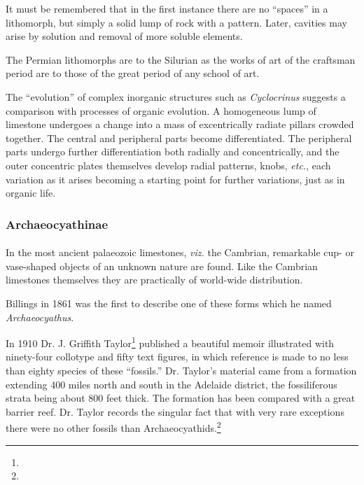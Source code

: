 \documentclass[a4paper, 12pt, oneside]{article}
\begin{document}
It must be remembered that in the first instance there are no ``spaces'' in a lithomorph, but simply a solid lump of rock with a pattern. Later, cavities may arise by solution and removal of more soluble elements.

The Permian lithomorphs are to the Silurian as the works of art of the craftsman period are to those of the great period of any school of art.

The ``evolution'' of complex inorganic structures such as \emph{Cyclocrinus} suggests a comparison with processes of organic evolution. A homogeneous lump of limestone undergoes a change into a mass of excentrically radiate pillars crowded together. The central and peripheral parts become differentiated. The peripheral parts undergo further differentiation both radially and concentrically, and the outer concentric plates themselves develop radial patterns, knobs, \emph{etc.}, each variation as it arises becoming a starting point for further variations, just as in organic life.

\subsubsection{Archaeocyathinae}
\paragraph{}
In the most ancient palaeozoic limestones, \emph{viz.} the Cambrian, remarkable cup- or vase-shaped objects of an unknown nature are found. Like the Cambrian limestones themselves they are practically of world-wide distribution.

Billings in 1861 was the first to describe one of these forms which he named \emph{Archaeocyathus}.

In 1910 Dr. J. Griffith Taylor\footnote{} published a beautiful memoir illustrated with ninety-four collotype and fifty text figures, in which reference is made to no less than eighty species of these ``fossils.'' Dr. Taylor's material came from a formation extending 400 miles north and south in the Adelaide district, the fossiliferous strata being about 800 feet thick. The formation has been compared with a great barrier reef. Dr. Taylor records the singular fact that with very rare exceptions there were no other fossils than Archaeocyathids.\footnote{}
\end{document}
